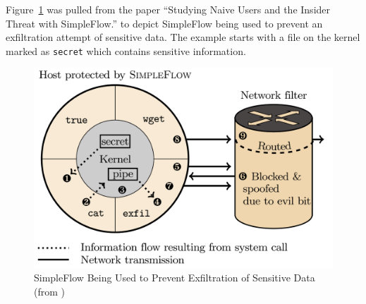 Figure~\ref{simpleflowexample} was pulled from the paper ``Studying Naive Users and the Insider Threat with SimpleFlow.''
to depict SimpleFlow being used to prevent an exfiltration attempt of sensitive data.
The example starts with a file on the kernel marked as \texttt{secret} which contains sensitive information.

\clearpage

\begin{figure}[h]
    \centering
    \includegraphics[width=.8\textwidth]{section01/assets/simpleflow_example.png}
    \caption[SimpleFlow Example]{SimpleFlow Being Used to Prevent Exfiltration of Sensitive Data (from \cite{ryan2016})\label{simpleflowexample}}
\end{figure}
